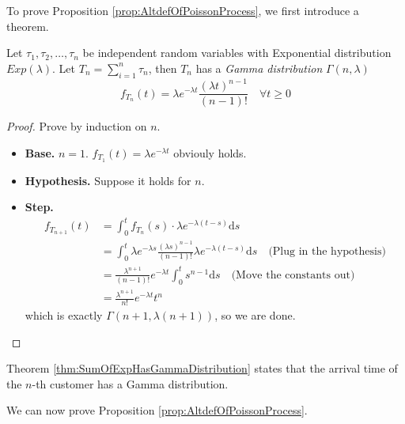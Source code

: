     To prove Proposition \ref{prop:AltdefOfPoissonProcess}, we first introduce a theorem.

    \begin{theorem}\label{thm:SumOfExpHasGammaDistribution}
        Let $\tau_1, \tau_2, \dots, \tau_n$ be independent random variables with Exponential distribution $Exp(\lambda)$. Let $T_n = \sum_{i=1}^n\tau_n$, then $T_n$ has a \emph{Gamma distribution} $\Gamma(n, \lambda)$
        \[ f_{T_n}(t) = \lambda e^{-\lambda t}\frac{(\lambda t)^{n-1}}{(n-1)!} \quad \forall t \ge 0 \]
    \end{theorem}
    \begin{proof}
        Prove by induction on $n$.
        \begin{itemize}
            \item \textbf{Base. } $n=1$. $f_{T_1}(t) = \lambda e^{-\lambda t}$ obviouly holds.
            \item \textbf{Hypothesis. } Suppose it holds for $n$.
            \item \textbf{Step. }
            \begin{align*}
                f_{T_{n+1}}(t) &= \int_0^t f_{T_n}(s)\cdot\lambda e^{-\lambda(t-s)}\mathrm{d}s\\
                &= \int_0^t \lambda e^{-\lambda s}\frac{(\lambda s)^{n-1}}{(n-1)!}\lambda e^{-\lambda(t-s)}\mathrm{d}s \quad \text{(Plug in the hypothesis)}\\
                &= \frac{\lambda^{n+1}}{(n-1)!}e^{-\lambda t}\int_0^t s^{n-1}\mathrm{d}s \quad \text{(Move the constants out)}\\
                &= \frac{\lambda^{n+1}}{n!}e^{-\lambda t}t^n
            \end{align*}
            which is exactly $\Gamma(n+1, \lambda(n+1))$, so we are done.
        \end{itemize}
    \end{proof}
    \begin{remark}
        Theorem \ref{thm:SumOfExpHasGammaDistribution} states that the arrival time of the $n$-th customer has a Gamma distribution.
    \end{remark}

    We can now prove Proposition \ref{prop:AltdefOfPoissonProcess}.
